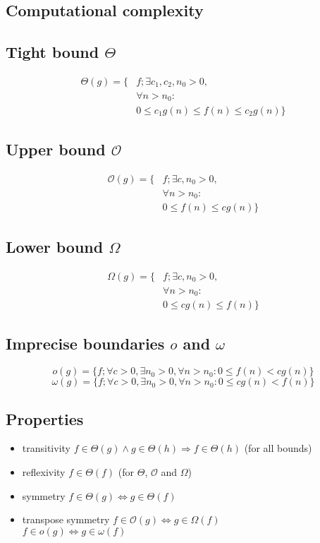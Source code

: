 
 

\begin{multicols}{5}
\setlength{\premulticols}{1pt}
\setlength{\postmulticols}{1pt}
\setlength{\multicolsep}{1pt}
\setlength{\columnsep}{2pt}

\section{Computational complexity}
\subsection{Tight bound $\Theta$}
\begin{align*}
	\Theta(g) = \{&f; \exists c_1,c_2,n_0>0, \\
	&\forall n>n_0: \\
	&0 \leq c_1g(n)\leq f(n) \leq c_2g(n)\}
\end{align*}
\subsection{Upper bound $\mathcal{O}$}
\begin{align*}
	\mathcal{O}(g) = \{&f; \exists c,n_0>0, \\
	&\forall n>n_0: \\
	&0 \leq f(n) \leq cg(n)\}
\end{align*}
\subsection{Lower bound $\Omega$}
\begin{align*}
	\Omega(g) = \{&f; \exists c,n_0>0, \\
	&\forall n>n_0: \\
	&0 \leq cg(n) \leq f(n)\}
\end{align*}
\subsection{Imprecise boundaries $o$ and $\omega$}
\[
	o(g) = \{f;\forall c>0,\exists n_0>0,\forall n > n_0: 0 \leq f(n) < cg(n)\}
\]
\[
	\omega(g) = \{f;\forall c>0,\exists n_0>0,\forall n > n_0: 0 \leq cg(n) < f(n)\}
\]
\subsection{Properties}
\begin{itemize}
	\item transitivity $f \in \Theta(g) \land g \in \Theta(h) \Rightarrow f \in \Theta(h)$ (for all bounds)
	\item reflexivity $f \in \Theta(f)$ (for $\Theta$, $\mathcal{O}$ and $\Omega$)
	\item symmetry $f \in \Theta(g) \Leftrightarrow g \in \Theta(f)$
	\item transpose symmetry $f \in \mathcal{O}(g) \Leftrightarrow g \in \Omega(f)$ \\
	$f \in o(g) \Leftrightarrow g \in \omega(f)$
\end{itemize}


\end{multicols}
